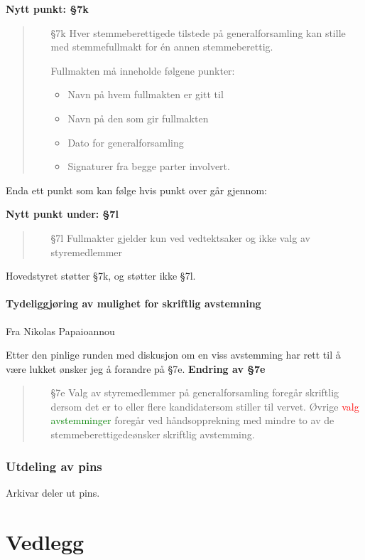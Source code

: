 \documentclass[10pt,norsk,a4paper]{article}
\begin{document}
\textbf{Nytt punkt: §7k}
\begin{quote}
    \begin{enumerate}
        \item[§7k]
            Hver stemmeberettigede tilstede på generalforsamling kan stille med
            stemmefullmakt for én annen  stemmeberettig.

            Fullmakten må inneholde følgene punkter:
            \begin{itemize}
                \item Navn på hvem fullmakten er gitt til
                \item Navn på den som gir fullmakten
                \item Dato for generalforsamling
                \item Signaturer fra begge parter involvert.
            \end{itemize}
    \end{enumerate}
\end{quote}

Enda ett punkt som kan følge hvis punkt over går gjennom:

\textbf{Nytt punkt under: §7l}
\begin{quote}
    \begin{enumerate}
        \item[§7l] Fullmakter gjelder kun ved vedtektsaker og ikke valg av styremedlemmer
    \end{enumerate}
\end{quote}

Hovedstyret støtter §7k, og støtter ikke §7l.

\subsection{Tydeliggjøring av mulighet for skriftlig avstemning}
Fra Nikolas Papaioannou

Etter den pinlige runden med diskusjon om en viss avstemming har rett til å være lukket ønsker jeg å forandre på §7e.
\textbf{Endring av §7e}
\begin{quote}
    \begin{enumerate}
        \item[§7e]
        Valg av styremedlemmer på generalforsamling foregår skriftlig dersom
        det er to eller flere kandidatersom stiller til vervet. Øvrige
        \textcolor{red}{valg} \textcolor{green}{avstemminger} foregår ved håndsopprekning med mindre
        to av de stemmeberettigedeønsker skriftlig avstemming.
    \end{enumerate}
\end{quote}

\newpage

\section{Utdeling av pins}

Arkivar deler ut pins.


\part*{Vedlegg}\label{lastpage}

\newpage
{}

\end{document}
